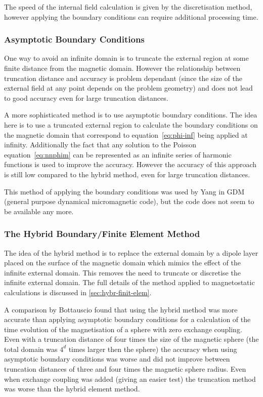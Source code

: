The speed of the internal field calculation is given by the discretisation method, however applying the boundary conditions can require additional processing time.


\subsubsection{Asymptotic Boundary Conditions}
\label{sec:asymptot-bcs}

One way to avoid an infinite domain is to truncate the external region at some finite distance from the magnetic domain. However the relationship between truncation distance and accuracy is problem dependant (since the size of the external field at any point depends on the problem geometry) and does not lead to good accuracy even for large truncation distances.

A more sophisticated method is to use asymptotic boundary conditions.\cite{Yang1997} The idea here is to use a truncated external region to calculate the boundary conditions on the magnetic domain that correspond to equation~\eqref{eq:phi-inf} being applied at infinity. Additionally the fact that any solution to the Poisson equation~\eqref{eq:nnphim} can be represented as an infinite series of harmonic functions is used to improve the accuracy. However the accuracy of this approach is still low compared to the hybrid method, even for large truncation distances.\cite{Bottauscio2008}

This method of applying the boundary conditions was used by Yang in GDM\cite{Yang1997} (general purpose dynamical micromagnetic code), but the code does not seem to be available any more.

\subsubsection{The Hybrid Boundary/Finite Element Method}
\label{sec:bound-elem-meth}

The idea of the hybrid method is to replace the external domain by a dipole layer placed on the surface of the magnetic domain which mimics the effect of the infinite external domain. This removes the need to truncate or discretise the infinite external domain. The full details of the method applied to magnetostatic calculations is discussed in \autoref{sec:hybr-finit-elem}.

A comparison by Bottauscio\cite{Bottauscio2008} found that using the hybrid method was more accurate than applying asymptotic boundary conditions for a calculation of the time evolution of the magnetisation of a sphere with zero exchange coupling. Even with a truncation distance of four times the size of the magnetic sphere (the total domain was $4^d$ times larger then the sphere) the accuracy when using asymptotic boundary conditions was worse and did not improve between truncation distances of three and four times the magnetic sphere radius. Even when exchange coupling was added (giving an easier test) the truncation method was worse than the hybrid element method.

